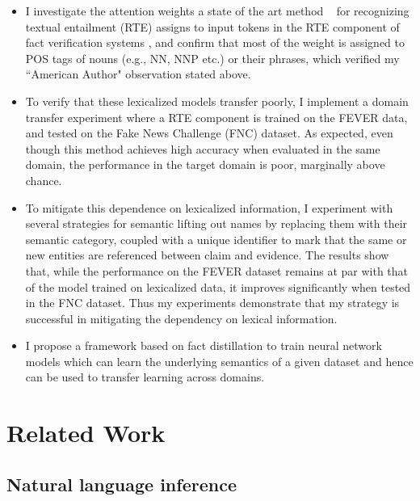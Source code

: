 \documentclass{article}
\begin{document}
\begin{itemize}

\item I investigate the attention weights a state of the art method  ~\cite{parikh2016decomposable}  for recognizing textual entailment (RTE) assigns to input tokens in the RTE component of fact verification systems \citep*{thorne2018fever,pomerleau2017fake}, and confirm that most of the weight is assigned to POS tags of nouns (e.g., NN, NNP etc.) or their phrases, which verified my ``American Author" observation stated above.

\item  To verify that these lexicalized models transfer poorly, I implement a domain transfer experiment where a RTE component is trained on the FEVER data, and tested on the Fake News Challenge (FNC) \citep{pomerleau2017fake} dataset. As expected, even though this method achieves high accuracy when evaluated in the same domain, the performance in the target domain is poor, marginally above chance.


\item  To mitigate this dependence on lexicalized information, I experiment with several strategies for semantic lifting out names by replacing them with their semantic category, coupled with a unique identifier to mark that the same or new entities are referenced between claim and evidence. The results show that, while the performance on the FEVER dataset remains at par with that of the model trained on lexicalized data, it improves significantly when tested in the FNC dataset. Thus my experiments demonstrate that my strategy is successful in mitigating the dependency on lexical information.


\item I propose a framework based on fact distillation to train neural network models which can learn the underlying semantics of a given dataset and hence can be used to transfer learning across domains.
\end{itemize}

\section{Related Work}
\subsection{Natural language inference}
\end{document}
